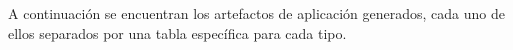 A continuación se encuentran los artefactos de aplicación generados, cada uno de ellos separados por una tabla específica para cada tipo.